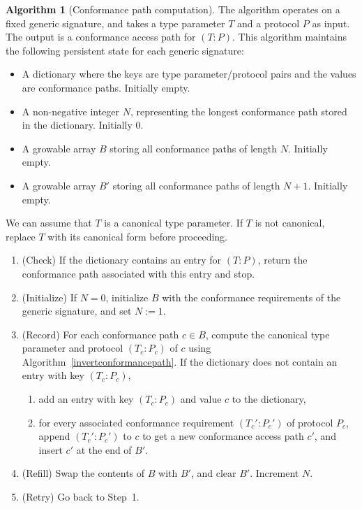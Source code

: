 \documentclass[a4paper,headsepline,bibliography=totoc,toc=flat,fleqn,twoside=semi]{scrbook}
\theoremstyle{definition}
\theoremstyle{definition}
\theoremstyle{definition}
\newtheorem{algorithm}{Algorithm}[chapter]
\begin{document}
\begin{algorithm}[Conformance path computation]
The algorithm operates on a fixed generic signature, and takes a type parameter $T$ and a protocol $P$ as input. The output is a conformance access path for $(T: P)$. This algorithm maintains the following persistent state for each generic signature:
\begin{itemize}
\item A dictionary where the keys are type parameter/protocol pairs and the values are conformance paths. Initially empty.
\item A non-negative integer $N$, representing the longest conformance path stored in the dictionary. Initially 0.
\item A growable array $B$ storing all conformance paths of length $N$. Initially empty.
\item A growable array $B'$ storing all conformance paths of length $N+1$. Initially empty.
\end{itemize}
We can assume that $T$ is a canonical type parameter. If $T$ is not canonical, replace $T$ with its canonical form before proceeding.
\begin{enumerate}
\item (Check) If the dictionary contains an entry for $(T: P)$, return the conformance path associated with this entry and stop.

\item (Initialize) If $N=0$, initialize $B$ with the conformance requirements of the generic signature, and set $N:=1$.
\item (Record) For each conformance path $c\in B$, compute the canonical type parameter and protocol $(T_c: P_c)$ of $c$ using Algorithm~\ref{invertconformancepath}. If the dictionary does not contain an entry with key $(T_c: P_c)$,

\begin{enumerate}
\item add an entry with key $(T_c: P_c)$ and value $c$ to the dictionary,

\item for every associated conformance requirement $(T_c': P_c')$ of protocol $P_c$, append $(T_c': P_c')$ to $c$ to get a new conformance access path $c'$, and insert $c'$ at the end of $B'$.
\end{enumerate}

\item (Refill) Swap the contents of $B$ with $B'$, and clear $B'$. Increment $N$.

\item (Retry) Go back to Step~1.
\end{enumerate}
\end{algorithm}
\end{document}
